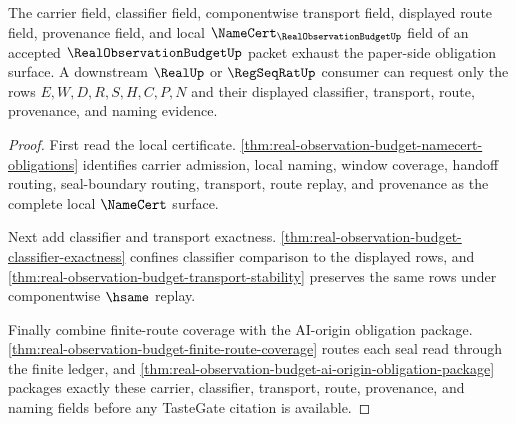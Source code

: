\begin{theorem}
\label{thm:real-observation-budget-namecert-field-saturation}
The carrier field, classifier field, componentwise transport field, displayed route field, provenance field, and local $\NameCert_{\RealObservationBudgetUp}$ field of an accepted $\RealObservationBudgetUp$ packet exhaust the paper-side obligation surface. A downstream $\RealUp$ or $\RegSeqRatUp$ consumer can request only the rows $E,W,D,R,S,H,C,P,N$ and their displayed classifier, transport, route, provenance, and naming evidence.
\end{theorem}
\begin{proof}
First read the local certificate. \autoref{thm:real-observation-budget-namecert-obligations} identifies carrier admission, local naming, window coverage, handoff routing, seal-boundary routing, transport, route replay, and provenance as the complete local $\NameCert$ surface.

Next add classifier and transport exactness. \autoref{thm:real-observation-budget-classifier-exactness} confines classifier comparison to the displayed rows, and \autoref{thm:real-observation-budget-transport-stability} preserves the same rows under componentwise $\hsame$ replay.

Finally combine finite-route coverage with the AI-origin obligation package. \autoref{thm:real-observation-budget-finite-route-coverage} routes each seal read through the finite ledger, and \autoref{thm:real-observation-budget-ai-origin-obligation-package} packages exactly these carrier, classifier, transport, route, provenance, and naming fields before any TasteGate citation is available.
\end{proof}

